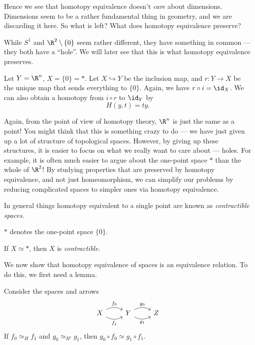 \documentclass[a4paper]{article}
\begin{document}
Hence we see that homotopy equivalence doesn't \emph{care} about dimensions. Dimensions seem to be a rather fundamental thing in geometry, and we are discarding it here. So what is left? What does homotopy equivalence preserve?

While $S^1$ and $\R^2 \setminus \{0\}$ seem rather different, they have something in common --- they both have a ``hole''. We will later see that this is what homotopy equivalence preserves.

\begin{eg}
  Let $Y = \R^n$, $X = \{0\} = *$. Let $X\hookrightarrow Y$ be the inclusion map, and $r: Y\to X$ be the unique map that sends everything to $\{0\}$. Again, we have $r\circ i = \id_X$. We can also obtain a homotopy from $i \circ r$ to $\id_Y$ by
  \[
    H(y, t) = ty.
  \]
\end{eg}
Again, from the point of view of homotopy theory, $\R^n$ is just the same as a point! You might think that this is something crazy to do --- we have just given up a lot of structure of topological spaces. However, by giving up these structures, it is easier to focus on what we really want to care about --- holes. For example, it is often much easier to argue about the one-point space $*$ than the whole of $\R^2$! By studying properties that are preserved by homotopy equivalence, and not just homeomorphism, we can simplify our problems by reducing complicated spaces to simpler ones via homotopy equivalence.

In general things homotopy equivalent to a single point are known as \emph{contractible spaces}.
\begin{notation}
  $*$ denotes the one-point space $\{0\}$.
\end{notation}

\begin{defi}
  If $X\simeq *$, then $X$ is \emph{contractible}.
\end{defi}

We now show that homotopy equivalence of spaces is an equivalence relation. To do this, we first need a lemma.
\begin{lemma}
  Consider the spaces and arrows
  \[
    \begin{tikzcd}
      X \ar[r, bend left, "f_0"] \ar[r, bend right, "f_1"'] & Y \ar[r, bend left, "g_0"] \ar[r, bend right, "g_1"'] & Z
    \end{tikzcd}
  \]
  If $f_0\simeq_H f_1$ and $g_0\simeq_{H'} g_1$, then $g_0\circ f_0 \simeq g_1 \circ f_1$.
\end{lemma}
\end{document}
